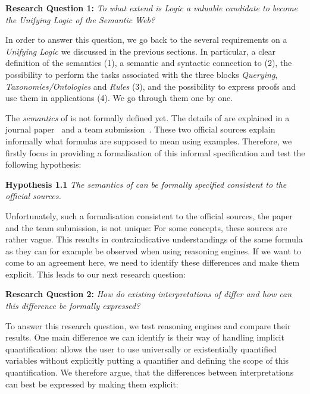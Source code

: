 \textbf{Research Question 1:} \textit{To what extend is \nthree Logic a valuable candidate to become the \emph{Unifying Logic} of the Semantic Web?}

In order to answer this question, we go back to the several requirements on a \emph{Unifying Logic} we discussed in the previous sections. 
In particular,
a clear definition of the semantics (1), a semantic and syntactic connection to \rdf (2), the possibility to perform the tasks associated with 
the three blocks \emph{Querying}, \emph{Taxonomies/Ontologies}
and \emph{Rules} (3), and the possibility to express proofs and use them in applications (4). We go through them one by one.

The \emph{semantics} of \nthree is not formally defined yet. The details of \nthreelogic 
are explained in a journal paper~\cite{N3Logic} and a \wwwc team submission~\cite{Notation3}. 
These two official sources explain informally what \nthree formulas are supposed to mean using examples.  Therefore, we firstly focus in providing a formalisation of this informal specification and test the following hypothesis:

\textbf{Hypothesis 1.1} \textit{The semantics of  \nthreelogic can be formally specified consistent to the official sources.}

Unfortunately, such a formalisation consistent to the official sources, the paper and the \wwwc team submission,  is not unique:
For some concepts, these sources are rather vague. This results in contraindicative understandings of the same formula as they can for example be observed 
when using \nthree reasoning engines.
If we want to come to an agreement here, we need to identify these differences and make them explicit. This leads to our next research question:

\textbf{Research Question 2:} \textit{How do existing interpretations of \nthree differ and how can this difference be formally expressed?}

To answer this research question, we test reasoning engines and compare their results. One main difference we can identify is their way of handling 
implicit quantification: \nthreelogic allows the user to use universally or existentially quantified variables 
without explicitly putting a quantifier and defining the scope of this quantification. We therefore argue, that the differences between interpretations can best be expressed 
by making them explicit:


